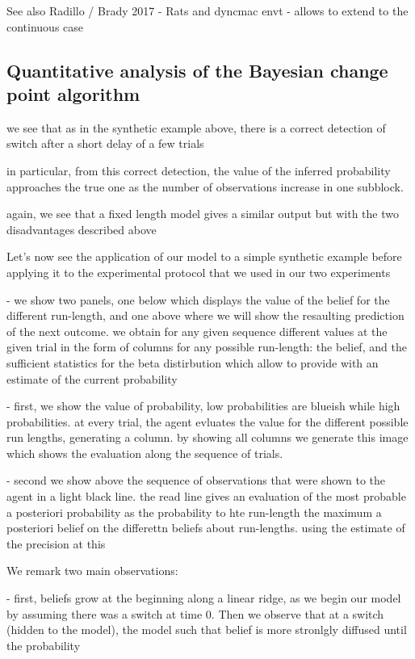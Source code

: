 \documentclass[profile,final,english, draft]{article}%
\begin{document}
See also Radillo / Brady 2017 - Rats and dyncmac envt - allows to extend to the continuous case

\subsection{Quantitative analysis of the Bayesian change point algorithm}
we see that as in the synthetic example above,
there is a correct detection of switch after a short delay of a few trials

in particular, from this correct detection,
the value of the inferred probability approaches
the true one as the number of observations increase in one subblock.

again, we see that a fixed length model gives a similar output
but with the two disadvantages described above


Let's now see the application of our model to a simple synthetic example before applying it to the experimental protocol that we used in our two experiments


- we show two panels, one below which displays the value of the belief for the different run-length, and one above where we will show the resaulting prediction of the next outcome.
we obtain for any given sequence different values at the given trial in the form of columns for any possible run-length: the belief,
and the sufficient statistics for the beta distirbution which allow to provide with an estimate of the current probability

- first, we show the value of probability, low probabilities are blueish while high probabilities. at every trial, the agent evluates the value for the different possible run lengths, generating a column. by showing all columns we generate this image which shows the evaluation along the sequence of trials.

- second we show above the sequence of observations that were shown to the agent in a light black line. the read line gives an evaluation of the most probable a posteriori probability as the probability to hte run-length the maximum a posteriori belief on the differettn beliefs about run-lengths. using the estimate of the precision at this

We remark two main observations:

- first, beliefs grow at the beginning along a linear ridge, as we begin our model by assuming there was a switch at time 0. Then we observe that at a switch (hidden to the model), the model
such that belief is more stronlgly diffused until the probability
\end{document}
